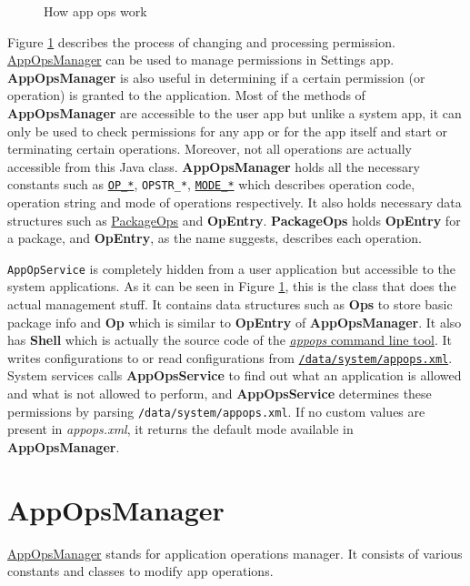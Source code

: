\begin{figure}[ht]
    \centering
    
    \caption{How app ops work}
    \label{fig:appops}
\end{figure}

Figure \hyperref[fig:appops]{1} describes the process of changing and processing permission.
\hyperref[sec:appopsmanager]{AppOpsManager} can be used to manage permissions in Settings app. \textbf{AppOpsManager} is
also useful in determining if a certain permission (or operation) is granted to the application. Most of the methods of
\textbf{AppOpsManager} are accessible to the user app but unlike a system app, it can only be used to check permissions
for any app or for the app itself and start or terminating certain operations. Moreover, not all operations are actually
accessible from this Java class. \textbf{AppOpsManager} holds all the necessary constants such as
\hyperref[subsec:op-constants]{\texttt{OP\_*}}, \texttt{OPSTR\_*}, \hyperref[subsec:mode-constants]{\texttt{MODE\_*}}
which describes operation code, operation string and mode of operations respectively. It also holds necessary data
structures such as \hyperref[subsec:package-ops]{PackageOps} and \textbf{OpEntry}. \textbf{PackageOps} holds
\textbf{OpEntry} for a package, and \textbf{OpEntry}, as the name suggests, describes each operation.

\texttt{AppOpService} is completely hidden from a user application but accessible to the system applications.
As it can be seen in Figure \hyperref[fig:appops]{1}, this is the class that does the actual management stuff.
It contains data structures such as \textbf{Ops} to store basic package info and \textbf{Op} which is similar to
\textbf{OpEntry} of \textbf{AppOpsManager}.
It also has \textbf{Shell} which is actually the source code of the \hyperref[sec:appops-cli]{\textit{appops} command line tool}.
It writes configurations to or read configurations from \hyperref[sec:appops-xml]{\texttt{/data/system/appops.xml}}.
System services calls \textbf{AppOpsService} to find out what an application is allowed and what is not allowed to perform,
and \textbf{AppOpsService} determines these permissions by parsing \texttt{/data/system/appops.xml}. If no custom values
are present in \textit{appops.xml}, it returns the default mode available in \textbf{AppOpsManager}.


\section{AppOpsManager}\label{sec:appopsmanager}
\href{https://android.googlesource.com/platform/frameworks/base/+/master/core/java/android/app/AppOpsManager.java}{AppOpsManager}
stands for application operations manager. It consists of various constants and classes to modify app operations.


